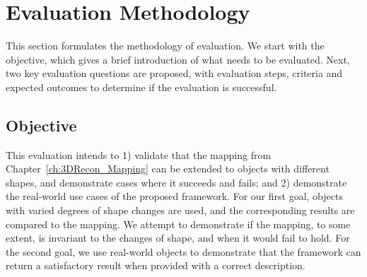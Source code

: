 
\section{Evaluation Methodology}
\label{sec:interp_eval_methodology}
This section formulates the methodology of evaluation. We start with the objective, which gives a brief introduction of what needs to be evaluated. Next, two key evaluation questions are proposed, with evaluation steps, criteria and expected outcomes to determine if the evaluation is successful.

\subsection{Objective}
This evaluation intends to 1) validate that the mapping from Chapter~\ref{ch:3DRecon_Mapping} can be extended to objects with different shapes, and demonstrate cases where it succeeds and fails; and 2) demonstrate the real-world use cases of the proposed framework. For our first goal, objects with varied degrees of shape changes are used, and the corresponding results are compared to the mapping. We attempt to demonstrate if the mapping, to some extent, is invariant to the changes of shape, and when it would fail to hold. For the second goal, we use real-world objects to demonstrate that the framework can return a satisfactory result when provided with a correct description.



